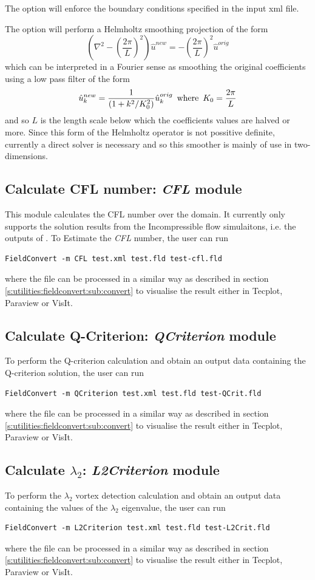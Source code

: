The option  will enforce the boundary conditions
specified in the input xml file.

The option  will perform a Helmholtz
smoothing projection of the form
\[
\left (\nabla^2 - \left (\frac{2 \pi}{L}\right )^2 \right ) \hat{u}^{new} =
-\left (\frac{2 \pi}{L}\right )^2 \hat{u}^{orig}
\]
which can be interpreted in a Fourier sense as smoothing the original
coefficients using a low pass filter of the form
\[
\hat{u}_k^{new} = \frac{1}{(1 + k^2/K_0^2)} \hat{u}_k^{orig} \mbox{\,  where  \,}
K_0 = \frac{2 \pi}{L}
\]
and so $L$ is the length scale below which the coefficients values are
halved or more. Since this form of the Helmholtz operator is not
possitive definite, currently a direct solver is necessary and so this
smoother is mainly of use in two-dimensions.
%
%
%
\subsection{Calculate CFL number: \textit{CFL} module}
This module calculates the CFL number over the domain. It currently only
supports the solution results from the Incompressible flow simulaitons, i.e.
the outputs of . To Estimate the \textit{CFL} 
number, the user can run
%
\begin{lstlisting}[style=BashInputStyle]
FieldConvert -m CFL test.xml test.fld test-cfl.fld
\end{lstlisting}


where the file  can be processed in a similar
way as described in section \ref{s:utilities:fieldconvert:sub:convert}
to visualise the result either in Tecplot, Paraview or VisIt.
%
%
%
\subsection{Calculate Q-Criterion: \textit{QCriterion} module}
To perform the Q-criterion calculation and obtain an output
data containing the Q-criterion solution, the user can run
%
\begin{lstlisting}[style=BashInputStyle]
FieldConvert -m QCriterion test.xml test.fld test-QCrit.fld
\end{lstlisting}
%
where the file  can be processed in a similar
way as described in section \ref{s:utilities:fieldconvert:sub:convert}
to visualise the result either in Tecplot, Paraview or VisIt.
%
%
%
\subsection{Calculate $\lambda_2$: \textit{L2Criterion} module}
To perform the $\lambda_2$ vortex detection calculation and obtain an output
data containing the values of the $\lambda_2$ eigenvalue, the user can run
%
\begin{lstlisting}[style=BashInputStyle]
  FieldConvert -m L2Criterion test.xml test.fld test-L2Crit.fld
\end{lstlisting}
%
where the file  can be processed in a similar
way as described in section \ref{s:utilities:fieldconvert:sub:convert}
to visualise the result either in Tecplot, Paraview or VisIt.
%
%
%

